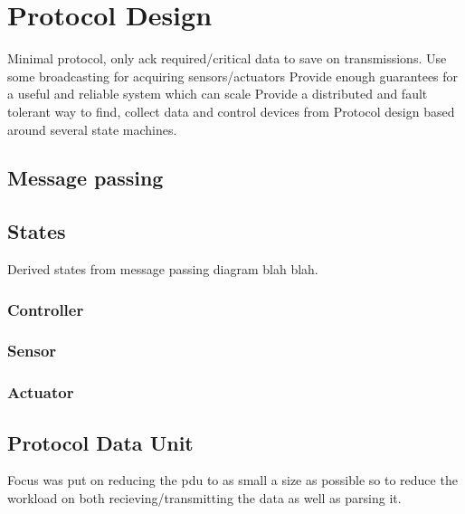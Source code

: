 \documentclass{l4proj}
\begin{document}
\section{Protocol Design} %
\label{sec:protocol_design}
Minimal protocol, only ack required/critical data to save on transmissions.
Use some broadcasting for acquiring sensors/actuators
Provide enough guarantees for a useful and reliable system which can scale
Provide a distributed and fault tolerant way to find, collect data and control devices from
Protocol design based around several state machines. 

\subsection{Message passing} %
\label{sub:message_passing}

\subsection{States} %
\label{sub:states}
Derived states from message passing diagram blah blah.

\subsubsection{Controller} %
\label{ssub:controller}

\subsubsection{Sensor} %
\label{ssub:sensor}

\subsubsection{Actuator} %
\label{ssub:actuator}




\subsection{Protocol Data Unit} %
\label{sub:protocol_data_unit}
Focus was put on reducing the pdu to as small a size as possible so to reduce the workload on both recieving/transmitting the data as well as parsing it.
\end{document}
